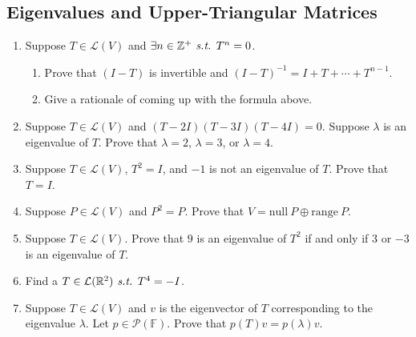\documentclass[11pt, letterpaper]{article}
\def\Zp{\mathbb{Z}^+}
\def\R{\mathbb{R}}
\def\F{\mathbb{F}}
\def\P{\mathcal{P}}
\def\L{\mathcal{L}}
\def\st{\emph{ s.t. }}
\def\Null{\mathrm{null\ }}
\def\range{\mathrm{range\ }}
\begin{document}
\subsection{Eigenvalues and Upper-Triangular Matrices}
\begin{enumerate}
	\item Suppose $T\in\L(V)$ and $\exists n\in\Zp\st T^n=0$. \begin{enumerate}\item Prove that $(I-T)$ is invertible and $(I-T)^{-1}=I+T+\cdots+T^{n-1}$.\item Give a rationale of coming up with the formula above. \end{enumerate}
	\item Suppose $T\in\L(V)$ and $(T-2I)(T-3I)(T-4I)=0$. Suppose $\lambda$ is an eigenvalue of $T$. Prove that $\lambda=2$, $\lambda=3$, or $\lambda=4$.
	\item Suppose $T\in\L(V)$, $T^2=I$, and $-1$ is not an eigenvalue of $T$. Prove that $T=I$.
	\item Suppose $P\in\L(V)$ and $P^2=P$. Prove that $V=\Null P\oplus\range P.$
	\item Suppose $T\in\L(V)$. Prove that $9$ is an eigenvalue of $T^2$ if and only if $3$ or $-3$ is an eigenvalue of $T$.
	\item Find a $T\in\L(\R^2)\st T^4=-I$.
	\item Suppose $T\in\L(V)$ and $v$ is the eigenvector of $T$ corresponding to the eigenvalue $\lambda$. Let $p\in\P(\F).$ Prove that $p(T)v=p(\lambda)v$. 
\end{enumerate}
\end{document}
